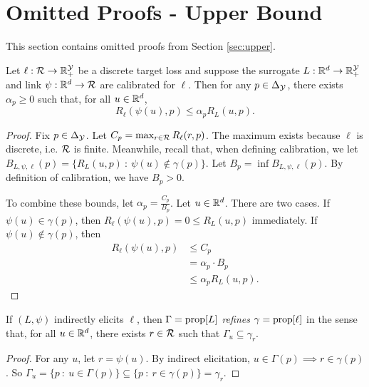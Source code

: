 
\appendix

\section{Omitted Proofs - Upper Bound} \label{app:upper}
This section contains omitted proofs from Section \ref{sec:upper}.

\begin{lemma*}
  Let $\ell: \mathcal{R} \to \mathbb{R}_+^{\mathcal{Y}}$ be a discrete target loss and suppose the surrogate $L: \mathbb{R}^d \to \mathbb{R}_+^{\mathcal{Y}}$ and link $\psi: \mathbb{R}^d \to \mathcal{R}$ are calibrated for $\ell$.
  Then for any $p \in \Delta_{\mathcal{Y}}$, there exists $\alpha_p \geq 0$ such that, for all $u \in \mathbb{R}^d$,
    \[ R_{\ell}(\psi(u),p) \leq \alpha_p R_L(u,p) . \]
\end{lemma*}
\begin{proof}
  Fix $p \in \Delta_{\mathcal{Y}}$.
  Let $C_p = \max_{r \in \mathcal{R}} R_{\ell}(r,p)$.
  The maximum exists because $\ell$ is discrete, i.e. $\mathcal{R}$ is finite.
  Meanwhile, recall that, when defining calibration, we let $B_{L,\psi,\ell}(p) = \{R_L(u,p) ~:~ \psi(u) \not\in \gamma(p)\}$.
  Let $B_p = \inf B_{L,\psi,\ell}(p)$.
  By definition of calibration, we have $B_p > 0$.

  To combine these bounds, let $\alpha_p = \frac{C_p}{B_p}$.
  Let $u \in \mathbb{R}^d$.
  There are two cases.
  If $\psi(u) \in \gamma(p)$, then $R_{\ell}(\psi(u),p) = 0 \leq R_L(u,p)$ immediately.
  If $\psi(u) \not\in \gamma(p)$, then
  \begin{align*}
    R_{\ell}(\psi(u),p)
    &\leq C_p \\
    &=    \alpha_p \cdot B_p  \\
    &\leq \alpha_p R_L(u,p) .
  \end{align*}
\end{proof}

\begin{lemma*}
  If $(L,\psi)$ indirectly elicits $\ell$, then $\Gamma = \mathrm{prop}[L]$ \emph{refines} $\gamma = \mathrm{prop}[\ell]$ in the sense that, for all $u \in \mathbb{R}^d$, there exists $r \in \mathcal{R}$ such that $\Gamma_u \subseteq \gamma_r$.
\end{lemma*}
\begin{proof}
  For any $u$, let $r = \psi(u)$.
  By indirect elicitation, $u \in \Gamma(p) \implies r \in \gamma(p)$.
  So $\Gamma_u = \{p ~:~ u \in \Gamma(p)\} \subseteq \{p ~:~ r \in \gamma(p)\} = \gamma_r$.
\end{proof}

